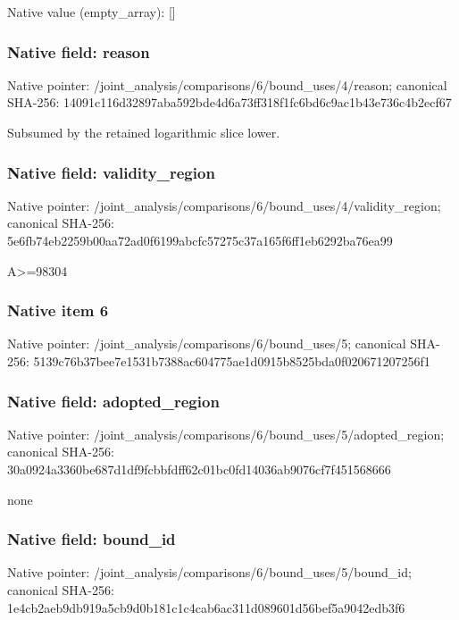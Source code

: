 \documentclass[10pt,a4paper]{article}
\begin{document}
Native value (empty\_\allowbreak{}array): []

\subsubsection{Native field: reason}
Native pointer: /joint\_\allowbreak{}analysis/comparisons/6/bound\_\allowbreak{}uses/4/reason; canonical SHA-256: 14091c116d32897aba592bde4d6a73ff318f1fc6bd6c9ac1b43e736c4b2ecf67

\begingroup\raggedright\sloppy Subsumed by the retained logarithmic slice lower.\par\endgroup

\subsubsection{Native field: validity\_\allowbreak{}region}
Native pointer: /joint\_\allowbreak{}analysis/comparisons/6/bound\_\allowbreak{}uses/4/validity\_\allowbreak{}region; canonical SHA-256: 5e6fb74eb2259b00aa72ad0f6199abcfc57275c37a165f6ff1eb6292ba76ea99

\begingroup\raggedright\sloppy A>=\allowbreak{}98304\par\endgroup

\subsubsection{Native item 6}
Native pointer: /joint\_\allowbreak{}analysis/comparisons/6/bound\_\allowbreak{}uses/5; canonical SHA-256: 5139c76b37bee7e1531b7388ac604775ae1d0915b8525bda0f020671207256f1

\subsubsection{Native field: adopted\_\allowbreak{}region}
Native pointer: /joint\_\allowbreak{}analysis/comparisons/6/bound\_\allowbreak{}uses/5/adopted\_\allowbreak{}region; canonical SHA-256: 30a0924a3360be687d1df9fcbbfdff62c01bc0fd14036ab9076cf7f451568666

\begingroup\raggedright\sloppy none\par\endgroup

\subsubsection{Native field: bound\_\allowbreak{}id}
Native pointer: /joint\_\allowbreak{}analysis/comparisons/6/bound\_\allowbreak{}uses/5/bound\_\allowbreak{}id; canonical SHA-256: 1e4cb2aeb9db919a5cb9d0b181c1c4cab6ac311d089601d56bef5a9042edb3f6
\end{document}
